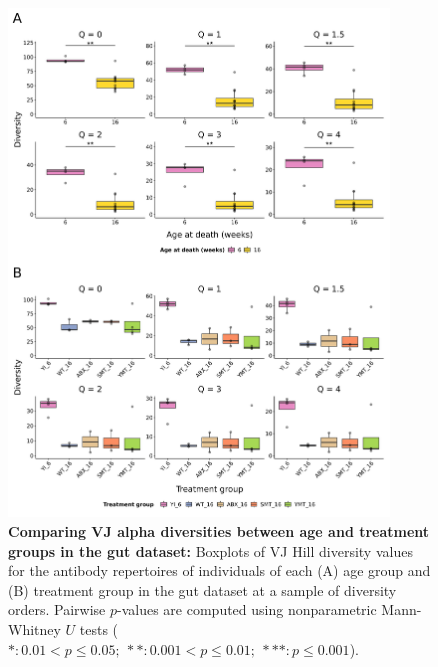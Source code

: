 \begin{figure}
\centering
\begin{subfigure}{0em}
\label{fig:igseq-gut-VJ-diversity-solo-age}
\end{subfigure}
\begin{subfigure}{0em}
\label{fig:igseq-gut-VJ-diversity-solo-groups}
\end{subfigure}
\includegraphics[width = 0.9\textwidth]{_Figures/png/igseq-gut-VJ-diversity-solo-boxplots}
\caption[Comparing VJ alpha diversities between age and treatment groups in the \igseq gut dataset]{\textbf{Comparing VJ alpha diversities between age and treatment groups in the \igseq gut dataset:} Boxplots of VJ Hill diversity values for the antibody repertoires of individuals of each (A) age group and (B) treatment group in the \igseq gut dataset at a sample of diversity orders. Pairwise $p$-values are computed using nonparametric Mann-Whitney $U$ tests ($*: 0.01 < p \leq 0.05;~**: 0.001 < p \leq 0.01;~***: p \leq 0.001$).}
\label{fig:igseq-gut-VJ-diversity-solo-boxplots}
\end{figure}

